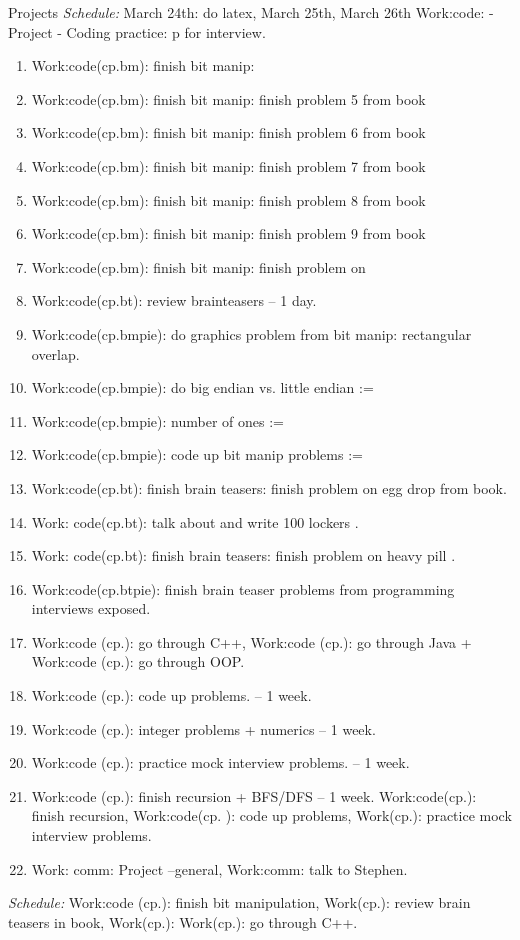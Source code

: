 \documentclass[serif, mathserif, final]{beamer}
\begin{document}
\begin{frame}
\begin{columns}
\begin{block}{Projects}
\textit{Schedule:} March 24th: do latex, March 25th, March 26th
Work:code: - Project - Coding practice: p for interview. 
\begin{enumerate} 
\tiny \item \tiny Work:code(cp.bm): finish bit manip:  
\item \tiny Work:code(cp.bm): finish bit manip:  finish problem 5 from book 
\item \tiny Work:code(cp.bm): finish bit manip:  finish problem 6 from book 
\item \tiny Work:code(cp.bm): finish bit manip:  finish problem 7 from book
\item \tiny Work:code(cp.bm): finish bit manip:  finish problem 8 from book  
\item \tiny Work:code(cp.bm): finish bit manip:  finish problem 9 from book 
\item \tiny Work:code(cp.bm): finish bit manip:  finish problem on
\item \tiny Work:code(cp.bt): review brainteasers – 1 day. 
\item \tiny Work:code(cp.bmpie): do graphics problem from bit manip:
  rectangular overlap. 
\item \tiny Work:code(cp.bmpie): do big endian vs. little endian := 
\item \tiny Work:code(cp.bmpie): number of ones  := 
\item \tiny Work:code(cp.bmpie): code up bit manip problems :=  
\item \tiny Work:code(cp.bt): finish brain teasers:  finish problem on
  egg drop from book.  
\item\tiny Work: code(cp.bt): talk about and write 100 lockers . 
\item \tiny Work: code(cp.bt):  finish brain teasers: finish problem on heavy
pill . 
\item \tiny Work:code(cp.btpie): finish brain teaser problems from programming
interviews exposed. 
\item \tiny Work:code (cp.): go through C++, Work:code (cp.): go through Java +
Work:code (cp.): go through OOP. 
\item \tiny Work:code (cp.): code up problems.  – 1 week. 
\item \tiny Work:code (cp.): integer problems + numerics   -- 1 week. 
\item \tiny Work:code (cp.): practice mock interview problems. – 1 week.   
\item \tiny Work:code (cp.): finish recursion + BFS/DFS – 1 week. 
Work:code(cp.): finish recursion, Work:code(cp. ): code up problems,
Work(cp.): practice mock interview problems. 
\item \tiny Work: comm: Project –general,  Work:comm: talk to Stephen. 
\end{enumerate} 
\textit{Schedule:} Work:code (cp.): finish bit manipulation, Work(cp.): review
brain teasers in book, Work(cp.): Work(cp.): go through C++.  \\ 


\end{block}
\end{columns}
\end{frame}
\end{document}
